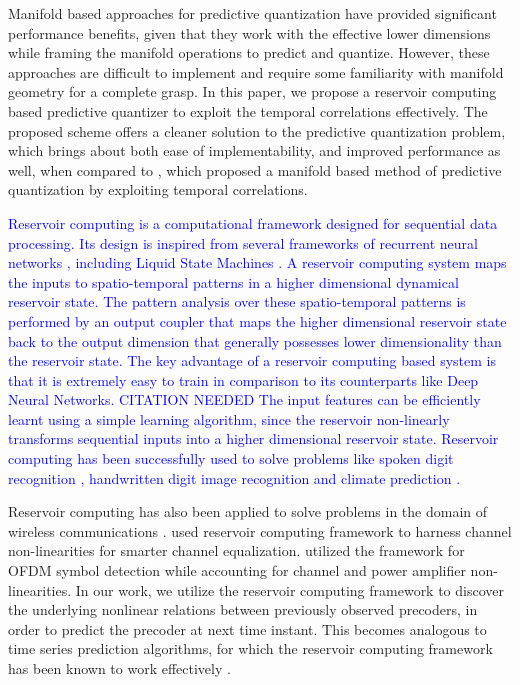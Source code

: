 \documentclass[conference]{IEEEtran}
\begin{document}
Manifold based approaches for predictive quantization have provided significant performance benefits, given that they work with the effective lower dimensions while framing the manifold operations to predict and quantize.
However, these approaches are difficult to implement and require some familiarity with manifold geometry for a complete grasp.
In this paper, we propose a reservoir computing based predictive quantizer to exploit the temporal correlations effectively.
The proposed scheme offers a cleaner solution to the predictive quantization problem, which brings about both ease of implementability, and improved performance as well, when compared to \cite{6891198}, which proposed a manifold based method of predictive quantization by exploiting temporal correlations.

\textcolor{blue}{
Reservoir computing is a computational framework designed for sequential data processing.
Its design is inspired from several frameworks of recurrent neural networks \cite{jaeger2004harnessing}, including Liquid State Machines \cite{jalalvand2015real}.
A reservoir computing system maps the inputs to spatio-temporal patterns in a higher dimensional dynamical reservoir state.
The pattern analysis over these spatio-temporal patterns is performed by an output coupler that maps the higher dimensional reservoir state back to the output dimension that generally possesses lower dimensionality than the reservoir state.
The key advantage of a reservoir computing based system is that it is extremely easy to train in comparison to its counterparts like Deep Neural Networks. CITATION NEEDED
The input features can be efficiently learnt using a simple learning algorithm, since the reservoir non-linearly transforms sequential inputs into a higher dimensional reservoir state.
Reservoir computing has been successfully used to solve problems like spoken digit recognition \cite{verstraeten2005isolated}, handwritten digit image recognition \cite{jalalvand2015real} and climate prediction \cite{pathak2017using}.}

\noindent Reservoir computing has also been applied to solve problems in the domain of wireless communications \cite{jaeger2004harnessing,mosleh2017brain,shafin2018realizing}.
\cite{jaeger2004harnessing} used reservoir computing framework to harness channel non-linearities for smarter channel equalization.
\cite{mosleh2017brain,shafin2018realizing} utilized the framework for OFDM symbol detection while accounting for channel and power amplifier non-linearities.
In our work, we utilize the reservoir computing framework to discover the underlying nonlinear relations between previously observed precoders, in order to predict the precoder at next time instant. This becomes analogous to time series prediction algorithms, for which the reservoir computing framework has been known to work effectively \cite{mosleh2017brain}.
\end{document}
